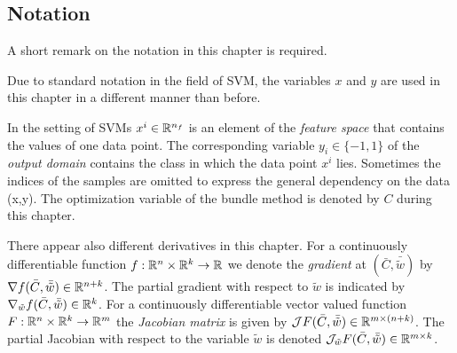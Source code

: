 

\subsection{Notation}

A short remark on the notation in this chapter is required.

Due to standard notation in the field of SVM, the variables \(x\) and \(y\) are used in this chapter in a different manner than before.

In the setting of SVMs \(x^i \in \mathbb{R}^{n_f}\) is an element of the \emph{feature space} that contains the values of one data point. The corresponding variable \(y_i \in \{-1,1\}\) of the \emph{output domain} contains the class in which the data point \(x^i\) lies. Sometimes the indices of the samples are omitted to express the general dependency on the data (x,y).
The optimization variable of the bundle method is denoted by \(C\) during this chapter.


There appear also different derivatives in this chapter.
For a continuously differentiable function \(f:\mathbb{R}^n \times \mathbb{R}^k \to \mathbb{R}\) we denote the \emph{gradient} at \((\bar{C},\bar{\tilde{w}})\) by \(\nabla f(\bar{C},\bar{\tilde{w}}) \in \mathbb{R}^{n+k}\). The partial gradient with respect to \(\tilde{w}\) is indicated by \(\nabla_{\tilde{w}}f(\bar{C},\bar{\tilde{w}}) \in \mathbb{R}^k \). %
For a continuously differentiable vector valued function \(F:\mathbb{R}^n \times \mathbb{R}^k \to \mathbb{R}^m\) the \emph{Jacobian matrix} is given by \( \mathcal{J}F(\bar{C},\bar{\tilde{w}}) \in \mathbb{R}^{m \times (n+k)}\). The partial Jacobian with respect to the variable \(\tilde{w}\) is denoted \(\mathcal{J}_{\tilde{w}} F(\bar{C},\bar{\tilde{w}}) \in \mathbb{R}^{m \times k}\).

